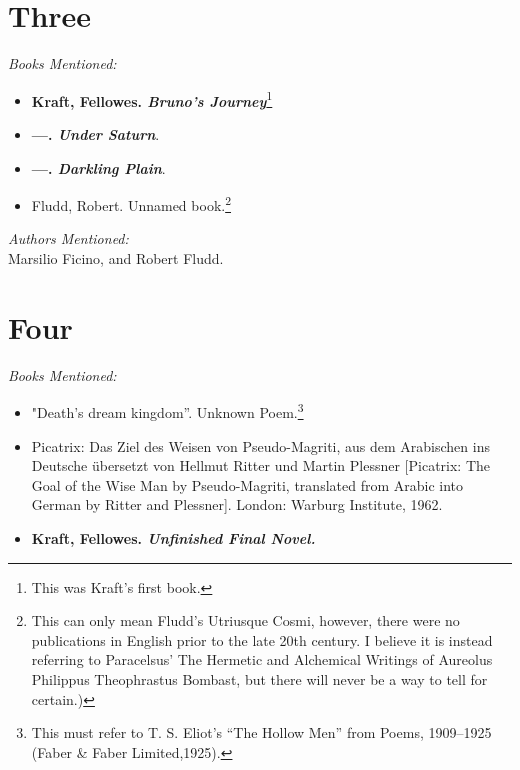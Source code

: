 \documentclass[twoside,10pt]{report}
\begin{document}
\section{Three}
\textit{Books Mentioned:}
\begin{itemize}
\item \textbf{Kraft, Fellowes. \textit{Bruno’s Journey}}\footnote{This was Kraft’s first book.}
\item \textbf{---. \textit{Under Saturn}}.
\item \textbf{---. \textit{Darkling Plain}}.
\item Fludd, Robert. Unnamed book.\footnote{This can only mean Fludd’s Utriusque Cosmi, however, there were no publications in English prior to the late 20th century. I believe it is instead referring to Paracelsus’ The Hermetic and Alchemical Writings of Aureolus Philippus Theophrastus Bombast, but there will never be a way to tell for certain.)}
\end{itemize}
\textit{Authors Mentioned:}\\
Marsilio Ficino, and Robert Fludd.

\section{Four}
\textit{Books Mentioned:}
\begin{itemize}
\item "Death’s dream kingdom”. Unknown Poem.\footnote{This must refer to T. S. Eliot’s “The Hollow Men” from Poems, 1909–1925 (Faber \& Faber Limited,1925).}
\item Picatrix: Das Ziel des Weisen von Pseudo-Magriti, aus dem Arabischen ins Deutsche übersetzt von Hellmut Ritter und Martin Plessner [Picatrix: The Goal of the Wise Man by Pseudo-Magriti, translated from Arabic into German by Ritter and Plessner]. London: Warburg Institute, 1962.\cite{Picatrix1962}
\item \textbf{Kraft, Fellowes. \textit{Unfinished Final Novel.}}
\end{itemize}
\end{document}
